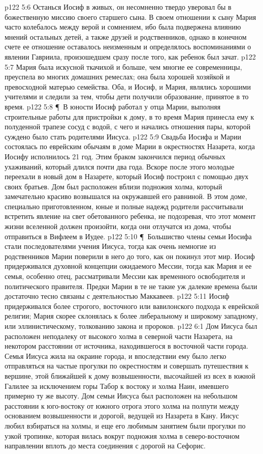 \vs p122 5:6 Останься Иосиф в живых, он несомненно твердо уверовал бы в божественную миссию своего старшего сына. В своем отношении к сыну Мария часто колебалось между верой и сомнением, ибо была подвержена влиянию мнений остальных детей, а также друзей и родственников, однако в конечном счете ее отношение оставалось неизменным и определялось воспоминаниями о явлении Гавриила, произошедшем сразу после того, как ребенок был зачат.
\vs p122 5:7 Мария была искусной ткачихой и больше, чем многие ее современницы, преуспела во многих домашних ремеслах; она была хорошей хозяйкой и превосходной матерью семейства. Оба, и Иосиф, и Мария, являлись хорошими учителями и следили за тем, чтобы дети получили образование, принятое в то время.
\vs p122 5:8 \P\ В юности Иосиф работал у отца Марии, выполняя строительные работы для пристройки к дому, в то время Мария принесла ему к полуденной трапезе сосуд с водой, с чего и начались отношения пары, которой суждено было стать родителями Иисуса.
\vs p122 5:9 Свадьба Иосифа и Марии состоялась по еврейским обычаям в доме Марии в окрестностях Назарета, когда Иосифу исполнилось 21 год. Этим браком закончился период обычных ухаживаний, который длился почти два года. Вскоре после этого молодые переехали в новый дом в Назарете, который Иосиф построил с помощью двух своих братьев. Дом был расположен вблизи подножия холма, который замечательно красиво возвышался на окружавшей его равниной. В этом доме, специально приготовленном, юные и полные надежд родители рассчитывали встретить явление на свет обетованного ребенка, не подозревая, что этот момент жизни вселенной должен произойти, когда они отлучатся из дома, чтобы отправиться в Вифлеем в Иудее.
\vs p122 5:10 \P\ Большиство члены семьи Иосифа стали последователями учения Иисуса, тогда как очень немногие из родственников Марии поверили в него до того, как он покинул этот мир. Иосиф придерживался духовной концепции ожидаемого Мессии, тогда как Мария и ее семья, особенно отец, рассматривали Мессии как временного освободителя и политического правителя. Предки Марии в те не такие уж далекие времена были достаточно тесно связаны с деятельностью Маккавеев.
\vs p122 5:11 Иосиф придерживался более строгого, восточного или вавилонского подхода к еврейской религии; Мария скорее склонялась к более либеральному и широкому западному, или эллинистическому, толкованию закона и пророков.
\vs p122 6:1 Дом Иисуса был расположен неподалеку от высокого холма в северной части Назарета, на некотором расстоянии от источника, находившегося в восточной части города. Семья Иисуса жила на окраине города, и впоследствии ему было легко отправляться на частые прогулки по окрестностям и совершать путешествия к вершине, этой ближайшей к дому возвышенности, высочайшей из всех в южной Галилее за исключением горы Табор к востоку и холма Наин, имевшего примерно ту же высоту. Дом семьи Иисуса был расположен на небольшом расстоянии к юго\hyp{}востоку от южного отрога этого холма на полпути между основанием возвышенности и дорогой, ведущей из Назарета в Кану. Иисус любил взбираться на холмы, и еще его любимым занятием были прогулки по узкой тропинке, которая вилась вокруг подножия холма в северо\hyp{}восточном направлении вплоть до места соединения с дорогой на Сефорис.
